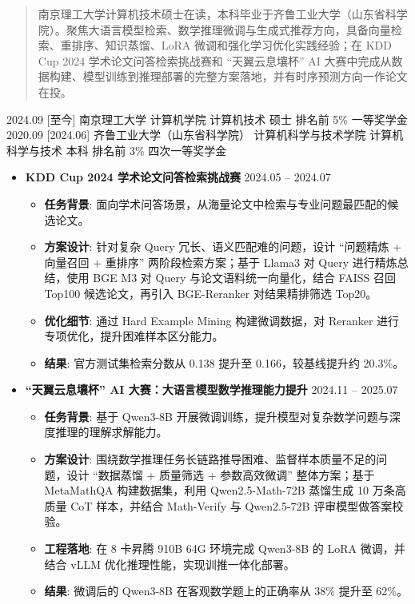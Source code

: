 \documentclass[zh]{resume}
\begin{document}
\makeheader

\begin{abstract}
南京理工大学计算机技术硕士在读，本科毕业于齐鲁工业大学（山东省科学院）。聚焦大语言模型检索、数学推理微调与生成式推荐方向，具备向量检索、重排序、知识蒸馏、LoRA 微调和强化学习优化实践经验；在 KDD Cup 2024 学术论文问答检索挑战赛和 ``天翼云息壤杯'' AI 大赛中完成从数据构建、模型训练到推理部署的完整方案落地，并有时序预测方向一作论文在投。
\end{abstract}

\begin{educations}
  \education%
    {2024.09}%
    [至今]%
    {南京理工大学}%
    {计算机学院}%
    {计算机技术}%
    {硕士 \quad 排名前 5\% \quad 一等奖学金}
  \separator{0.5ex}
  \education%
    {2020.09}%
    [2024.06]%
    {齐鲁工业大学（山东省科学院）}%
    {计算机科学与技术学院}%
    {计算机科学与技术}%
    {本科 \quad 排名前 3\% \quad 四次一等奖学金}
\end{educations}

\begin{itemize}
  \item \textbf{KDD Cup 2024 学术论文问答检索挑战赛} \hfill 2024.05 -- 2024.07
  \begin{itemize}
    \item \textbf{任务背景}: 面向学术问答场景，从海量论文中检索与专业问题最匹配的候选论文。
    \item \textbf{方案设计}: 针对复杂 Query 冗长、语义匹配难的问题，设计 ``问题精炼 + 向量召回 + 重排序'' 两阶段检索方案；基于 Llama3 对 Query 进行精炼总结，使用 BGE M3 对 Query 与论文语料统一向量化，结合 FAISS 召回 Top100 候选论文，再引入 BGE-Reranker 对结果精排筛选 Top20。
    \item \textbf{优化细节}: 通过 Hard Example Mining 构建微调数据，对 Reranker 进行专项优化，提升困难样本区分能力。
    \item \textbf{结果}: 官方测试集检索分数从 0.138 提升至 0.166，较基线提升约 20.3\%。
  \end{itemize}

  \item \textbf{``天翼云息壤杯'' AI 大赛：大语言模型数学推理能力提升} \hfill 2024.11 -- 2025.07
  \begin{itemize}
    \item \textbf{任务背景}: 基于 Qwen3-8B 开展微调训练，提升模型对复杂数学问题与深度推理的理解求解能力。
    \item \textbf{方案设计}: 围绕数学推理任务长链路推导困难、监督样本质量不足的问题，设计 ``数据蒸馏 + 质量筛选 + 参数高效微调'' 整体方案；基于 MetaMathQA 构建数据集，利用 Qwen2.5-Math-72B 蒸馏生成 10 万条高质量 CoT 样本，并结合 Math-Verify 与 Qwen2.5-72B 评审模型做答案校验。
    \item \textbf{工程落地}: 在 8 卡昇腾 910B 64G 环境完成 Qwen3-8B 的 LoRA 微调，并结合 vLLM 优化推理性能，实现训推一体化部署。
    \item \textbf{结果}: 微调后的 Qwen3-8B 在客观数学题上的正确率从 38\% 提升至 62\%。
  \end{itemize}
\end{itemize}
\end{document}
